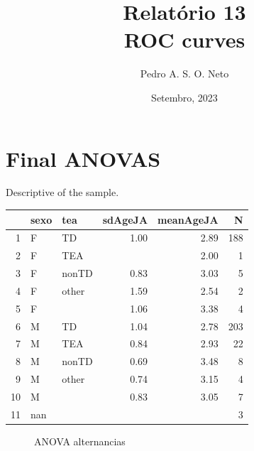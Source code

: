 \documentclass{article}
\title{Relatório 13 \\ ROC curves}
\author{Pedro A. S. O. Neto}
\date{Setembro, 2023}
\begin{document}
\maketitle

\section{Final ANOVAS}

Descriptive of the sample. 

\begin{table}[ht]
\centering
\begin{tabular}{rllrrr}
  \hline
 & sexo & tea & sdAgeJA & meanAgeJA & N \\ 
  \hline
1 & F & TD & 1.00 & 2.89 & 188 \\ 
  2 & F & TEA &  & 2.00 &   1 \\ 
  3 & F & nonTD & 0.83 & 3.03 &   5 \\ 
  4 & F & other & 1.59 & 2.54 &   2 \\ 
  5 & F &  & 1.06 & 3.38 &   4 \\ 
  6 & M & TD & 1.04 & 2.78 & 203 \\ 
  7 & M & TEA & 0.84 & 2.93 &  22 \\ 
  8 & M & nonTD & 0.69 & 3.48 &   8 \\ 
  9 & M & other & 0.74 & 3.15 &   4 \\ 
  10 & M &  & 0.83 & 3.05 &   7 \\ 
  11 & nan &  &  &  &   3 \\ 
   \hline
\end{tabular}
\end{table}

\begin{figure}[H]
  \caption{ANOVA alternancias}
  \noindent{}
  \centering
\end{figure}
\end{document}
